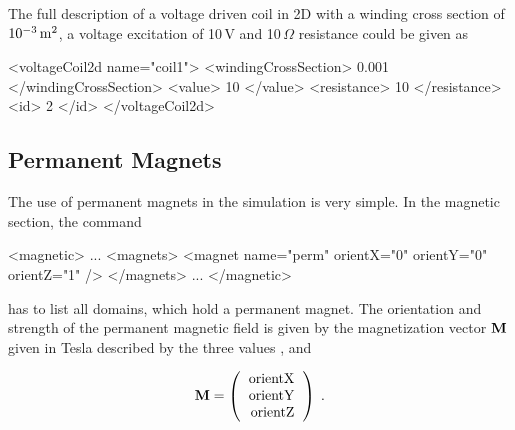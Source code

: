 The full description of a voltage driven coil in 2D with a winding
cross section of $10^{-3}\, \rm m^2$, a voltage excitation of 10\,V
and 10\,$\Omega$ resistance could be given as
\begin{xmllisting}
<voltageCoil2d name="coil1">
   <windingCrossSection> 0.001  </windingCrossSection>
   <value>                  10  </value>
   <resistance>             10  </resistance>
   <id>                      2  </id>
</voltageCoil2d>
\end{xmllisting}
% 


\subsection{Permanent Magnets}
The use of permanent magnets in the simulation is very simple. In the
magnetic section, the command

\begin{xmllisting}
<magnetic>
...
  <magnets>
   <magnet name="perm" orientX="0" orientY="0" orientZ="1" />
  </magnets>
...
</magnetic>
\end{xmllisting}
has to list all domains, which hold a permanent magnet. The
orientation and strength of the permanent magnetic field is given by
the magnetization vector ${\bf M}$ given in Tesla described by the three
values { }, { } and { }

\begin{equation}
  \label{eq:M}
  \bM = \left(
    \begin{tabular}{r}
      orientX\\
      orientY\\
      orientZ
    \end{tabular}
\right) \; .
\end{equation}

